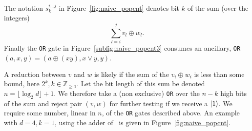 \documentclass[notitlepage]{article}
\theoremstyle{definition}
\begin{document}
The notation $s^{i\dots j}_{k}$ in Figure~\ref{fig:naive_popcnt} denotes bit $k$ of the sum (over the integers)
\[
    \displaystyle\sum\limits_{l=i}^{j}{v_{l} \oplus w_{l}}.
\]
Finally the \texttt{OR} gate in Figure~\ref{subfig:naive_popcnt3} consumes an ancillary, \texttt{OR}$(a, x, y) = (a \oplus (xy), x\vee y, y)$.

A reduction between $v$ and $w$ is likely if the sum of the $v_{i} \oplus w_{i}$ is less than some bound, here $2^{k}, k \in \mathbb{Z}_{\geq 1}$.
Let the bit length of this sum be denoted $n = \lfloor\log_{2}d\rfloor + 1$.
We therefore take a (non exclusive) \texttt{OR} over the $n - k$ high bits of the sum and reject pair $(v, w)$ for further testing if we receive a $\ket{1}$.
We require some number, linear in $n$, of the \texttt{OR} gates described above.
An example with $d = 4, k = 1$, using the adder of~\cite{cuccaro2004new} is given in Figure~\ref{fig:naive_popcnt}.
\end{document}
